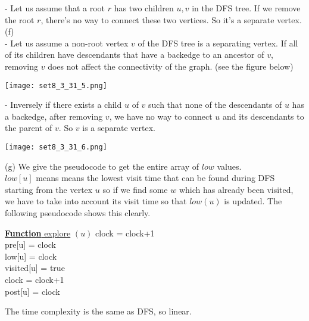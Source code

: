 \documentclass{article}
\begin{document}
- Let us assume that a root $r$ has two children $u, v$ in the DFS tree. If we remove the root $r$, there's no way to connect these two vertices. So it's a separate vertex.\\
(f)\\
- Let us assume a non-root vertex $v$ of the DFS tree is a separating vertex. If all of its children have descendants that have a backedge to an ancestor of $v$, removing $v$ does not affect the connectivity of the graph. (see the figure below)
\begin{center}
	\centering
	\texttt{[image: set8\_3\_31\_5.png]}
\end{center}
- Inversely if there exists a child $u$ of $v$ such that none of the descendants of $u$ has a backedge, after removing $v$, we have no way to connect $u$ and its descendants to the parent of $v$. So $v$ is a separate vertex.\\
\begin{center}
	\centering
	\texttt{[image: set8\_3\_31\_6.png]}
\end{center}
(g) We give the pseudocode to get the entire array of $low$ values.\\
$low[u]$ means means the lowest visit time that can be found during DFS starting from the vertex $u$
so if we find some $w$ which has already been visited, we have to take into account its visit time
so that $low(u)$ is updated. The following pseudocode shows this clearly.\\
\begin{function}
	\underline{{\bf Function} explore} $(u)$\;
	clock = clock+1\\
	pre[u] = clock\\
	low[u] = clock\\
	visited[u] = true \\
	clock =	clock+1\\
	post[u] = clock\\
\end{function}
The time complexity is the same as DFS, so linear.
\end{document}

